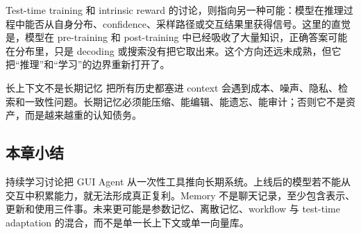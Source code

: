 Test-time training 和 intrinsic reward 的讨论，则指向另一种可能：模型在推理过程中能否从自身分布、confidence、采样路径或交互结果里获得信号。这里的直觉是，模型在 pre-training 和 post-training 中已经吸收了大量知识，正确答案可能在分布里，只是 decoding 或搜索没有把它取出来。这个方向还远未成熟，但它把“推理”和“学习”的边界重新打开了。

\begin{warningbox}{长上下文不是长期记忆}
把所有历史都塞进 context 会遇到成本、噪声、隐私、检索和一致性问题。长期记忆必须能压缩、能编辑、能遗忘、能审计；否则它不是资产，而是越来越重的认知债务。
\end{warningbox}

\subsection{本章小结}

持续学习讨论把 GUI Agent 从一次性工具推向长期系统。上线后的模型若不能从交互中积累能力，就无法形成真正复利。Memory 不是聊天记录，至少包含表示、更新和使用三件事。未来更可能是参数记忆、离散记忆、workflow 与 test-time adaptation 的混合，而不是单一长上下文或单一向量库。

